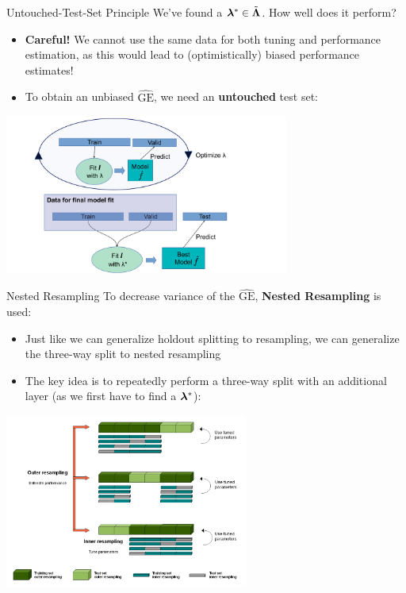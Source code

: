 \documentclass[11pt,compress,t,notes=noshow, xcolor=table]{beamer}
\begin{document}
\begin{vbframe}{Untouched-Test-Set Principle}
We've found a $\bm{\lambda}^{*} \in \tilde{\bm{\Lambda}}$. How well does it perform?
\begin{itemize}
\item \textbf{Careful!} We cannot use the same data for both tuning and performance estimation, as this would lead to (optimistically) biased performance estimates!
\item To obtain an unbiased $\widehat{\mathrm{GE}}$, we need an \textbf{untouched} test set:
\end{itemize}
\begin{center}
\includegraphics[width=0.7\textwidth]{../nested-resampling/figure_man/train_valid_test.pdf}
\end{center}

\end{vbframe}



\begin{vbframe}{Nested Resampling}
To decrease variance of the $\widehat{\mathrm{GE}}$, \textbf{Nested Resampling} is used:

\begin{itemize}
\item \small Just like we can generalize holdout splitting to resampling, we can generalize the three-way split to nested resampling
\item \small The key idea is to repeatedly perform a three-way split with an additional layer (as we first have to find a $\bm{\lambda}^{*}$):
\end{itemize}

\begin{center}
\includegraphics[width = 0.6\textwidth]{../nested-resampling/figure_man/Nested_Resampling.png}
\end{center}

\end{vbframe}
\end{document}
